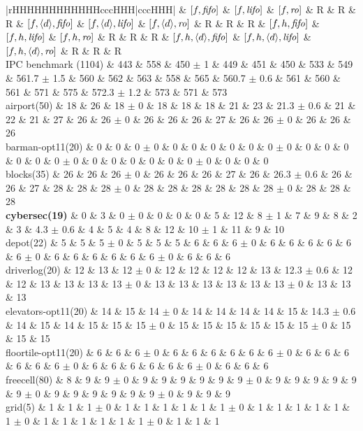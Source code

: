 \begin{center}
\begin{tabular}{|rHHHHHHHHHHHHcccHHH|cccHHH|}
\hline
 & $[f,{\text{\textit{fifo}}}]$ & $[f,{\text{\textit{lifo}}}]$ & $[f,{\text{\textit{ro}}}]$ & R & R & R & $[f,{\left<d\right>},{\text{\textit{fifo}}}]$ & $[f,{\left<d\right>},{\text{\textit{lifo}}}]$ & $[f,{\left<d\right>},{\text{\textit{ro}}}]$ & R & R & R & $[f,h,{\text{\textit{fifo}}}]$ & $[f,h,{\text{\textit{lifo}}}]$ & $[f,h,{\text{\textit{ro}}}]$ & R & R & R & $[f,h,{\left<d\right>},{\text{\textit{fifo}}}]$ & $[f,h,{\left<d\right>},{\text{\textit{lifo}}}]$ & $[f,h,{\left<d\right>},{\text{\textit{ro}}}]$ & R & R & R\\
\hline
IPC benchmark (1104) & 443 & 558 & 450 $\pm$ 1 & 449 & 451 & 450 & 533 & 549 & 561.7 $\pm$ 1.5 & 560 & 562 & 563 & 558 & 565 & 560.7 $\pm$ 0.6 & 561 & 560 & 561 & 571 & 575 & 572.3 $\pm$ 1.2 & 573 & 571 & 573\\
\hline
airport(50) & 18 & 26 & 18 $\pm$ 0 & 18 & 18 & 18 & 21 & 23 & 21.3 $\pm$ 0.6 & 21 & 22 & 21 & 27 & 26 & 26 $\pm$ 0 & 26 & 26 & 26 & 27 & 26 & 26 $\pm$ 0 & 26 & 26 & 26\\
barman-opt11(20) & 0 & 0 & 0 $\pm$ 0 & 0 & 0 & 0 & 0 & 0 & 0 $\pm$ 0 & 0 & 0 & 0 & 0 & 0 & 0 $\pm$ 0 & 0 & 0 & 0 & 0 & 0 & 0 $\pm$ 0 & 0 & 0 & 0\\
blocks(35) & 26 & 26 & 26 $\pm$ 0 & 26 & 26 & 26 & 27 & 26 & 26.3 $\pm$ 0.6 & 26 & 26 & 27 & 28 & 28 & 28 $\pm$ 0 & 28 & 28 & 28 & 28 & 28 & 28 $\pm$ 0 & 28 & 28 & 28\\
\textbf{cybersec(19)} & 0 & 3 & 0 $\pm$ 0 & 0 & 0 & 0 & 5 & 12 & 8 $\pm$ 1 & 7 & 9 & 8 & 2 & 3 & 4.3 $\pm$ 0.6 & 4 & 5 & 4 & 8 & 12 & 10 $\pm$ 1 & 11 & 9 & 10\\
depot(22) & 5 & 5 & 5 $\pm$ 0 & 5 & 5 & 5 & 6 & 6 & 6 $\pm$ 0 & 6 & 6 & 6 & 6 & 6 & 6 $\pm$ 0 & 6 & 6 & 6 & 6 & 6 & 6 $\pm$ 0 & 6 & 6 & 6\\
driverlog(20) & 12 & 13 & 12 $\pm$ 0 & 12 & 12 & 12 & 12 & 13 & 12.3 $\pm$ 0.6 & 12 & 12 & 13 & 13 & 13 & 13 $\pm$ 0 & 13 & 13 & 13 & 13 & 13 & 13 $\pm$ 0 & 13 & 13 & 13\\
elevators-opt11(20) & 14 & 15 & 14 $\pm$ 0 & 14 & 14 & 14 & 14 & 15 & 14.3 $\pm$ 0.6 & 14 & 15 & 14 & 15 & 15 & 15 $\pm$ 0 & 15 & 15 & 15 & 15 & 15 & 15 $\pm$ 0 & 15 & 15 & 15\\
floortile-opt11(20) & 6 & 6 & 6 $\pm$ 0 & 6 & 6 & 6 & 6 & 6 & 6 $\pm$ 0 & 6 & 6 & 6 & 6 & 6 & 6 $\pm$ 0 & 6 & 6 & 6 & 6 & 6 & 6 $\pm$ 0 & 6 & 6 & 6\\
freecell(80) & 8 & 9 & 9 $\pm$ 0 & 9 & 9 & 9 & 9 & 9 & 9 $\pm$ 0 & 9 & 9 & 9 & 9 & 9 & 9 $\pm$ 0 & 9 & 9 & 9 & 9 & 9 & 9 $\pm$ 0 & 9 & 9 & 9\\
grid(5) & 1 & 1 & 1 $\pm$ 0 & 1 & 1 & 1 & 1 & 1 & 1 $\pm$ 0 & 1 & 1 & 1 & 1 & 1 & 1 $\pm$ 0 & 1 & 1 & 1 & 1 & 1 & 1 $\pm$ 0 & 1 & 1 & 1\\

\end{tabular}
\end{center}
